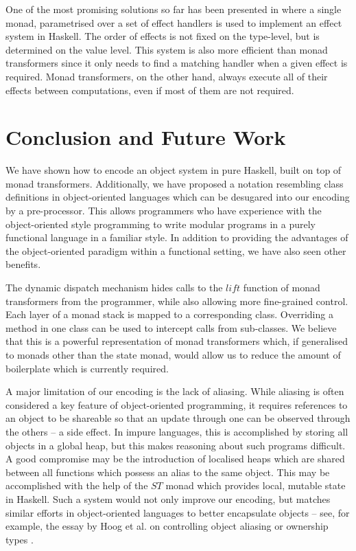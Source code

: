 \documentclass[runningheads,a4paper]{llncs}
\begin{document}
One of the most promising solutions so far has been presented in \cite{kiselyov2013extensible} where a single monad, parametrised over a set of effect handlers \cite{plotkin2009handlers} is used to implement an effect system in Haskell. The order of effects is not fixed on the type-level, but is determined on the value level. This system is also more efficient than monad transformers since it only needs to find a matching handler when a given effect is required. Monad transformers, on the other hand, always execute all of their effects between computations, even if most of them are not required. 

\section{Conclusion and Future Work}
\label{sec:conclusions}

We have shown how to encode an object system in pure Haskell, built on top of monad transformers. Additionally, we have proposed a notation resembling class definitions in object-oriented languages which can be desugared into our encoding by a pre-processor. This allows programmers who have experience with the object-oriented style programming to write modular programs in a purely functional language in a familiar style. In addition to providing the advantages of the object-oriented paradigm within a functional setting, we have also seen other benefits.

The dynamic dispatch mechanism hides calls to the $\mathit{lift}$ function of monad transformers from the programmer, while also allowing more fine-grained control. Each layer of a monad stack is mapped to a corresponding class. Overriding a method in one class can be used to intercept calls from sub-classes. We believe that this is a powerful representation of monad transformers which, if generalised to monads other than the state monad, would allow us to reduce the amount of boilerplate which is currently required.

A major limitation of our encoding is the lack of aliasing. While aliasing is often considered a key feature of object-oriented programming, it requires references to an object to be shareable so that an update through one can be observed through the others -- a side effect. In impure languages, this is accomplished by storing all objects in a global heap, but this makes reasoning about such programs difficult. A good compromise may be the introduction of localised heaps which are shared between all functions which possess an alias to the same object. This may be accomplished with the help of the $\mathit{ST}$ monad \cite{launchbury1995state} which provides local, mutable state in Haskell. Such a system would not only improve our encoding, but matches similar efforts in object-oriented languages to better encapsulate objects -- see, for example, the essay by Hoog et al. \cite{hogg1992geneva} on controlling object aliasing or ownership types \cite{clarke1998ownership}.
\end{document}

